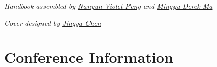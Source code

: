 \documentclass[twoside,makeidx]{book}
\begin{document}

\thispagestyle{empty}
\fancyfoot[C]{}

% 



\thispagestyle{empty}

% 

\vspace*{15.3em}
\noindent\emph{Handbook assembled by \href{https://vnpeng.net}{Nanyun Violet Peng} and \href{https://mingyu.ma}{Mingyu Derek Ma}}\\ 

\noindent\emph{Cover designed by \href{https://jingyachen.net}{Jingya Chen}}\\

\newpage
\cleardoublepage
\fancyfoot[C]{\thepage}
\frontmatter





\setcounter{tocdepth}{1}
\tableofcontents
\mainmatter
\pagestyle{fancy}


\chapter{Conference Information}


\clearpage


\clearpage%
\setheaders{}{}


\clearpage
\end{document}
